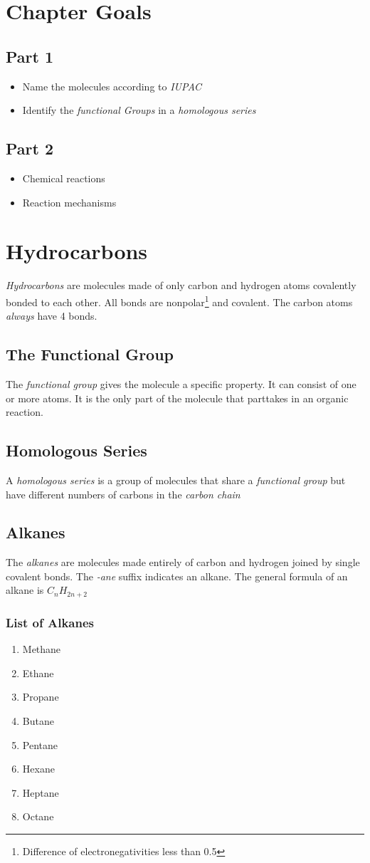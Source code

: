 \documentclass[11pt,twoside]{article}
\begin{document}
	\tableofcontents
	\section{Chapter Goals}
		\subsection{Part 1}
			\begin{itemize}
				\item{Name the molecules according to \emph{IUPAC}}
				\item{Identify the \emph{functional Groups} in a \emph{homologous series}}
			\end{itemize}
		\subsection{Part 2}
			\begin{itemize}
				\item{Chemical reactions}
				\item{Reaction mechanisms}
			\end{itemize}
	\section{Hydrocarbons}
	\emph{Hydrocarbons} are molecules made of only carbon and hydrogen atoms covalently bonded to each other. All bonds are nonpolar\footnote{Difference of electronegativities less than 0.5} and covalent. The carbon atoms \emph{always} have 4 bonds.
		\subsection{The Functional Group}
			The \emph{functional group} gives the molecule a specific property. It can consist of one or more atoms. It is the only part of the molecule that parttakes in an organic reaction.
		\subsection{Homologous Series}
			A \emph{homologous series} is a group of molecules that share a \emph{functional group} but have different numbers of carbons in the \emph{carbon chain}
		\subsection{Alkanes}
			The \emph{alkanes} are molecules made entirely of carbon and hydrogen joined by single covalent bonds. The \emph{-ane} suffix indicates an alkane. The general formula of an alkane is $C_n H_{2n+2}$
			\subsubsection{List of Alkanes}
				\begin{enumerate}
					\item{Methane}
					\item{Ethane}
					\item{Propane}
					\item{Butane}
					\item{Pentane}
					\item{Hexane}
					\item{Heptane}
					\item{Octane}
				\end{enumerate}
\end{document}
